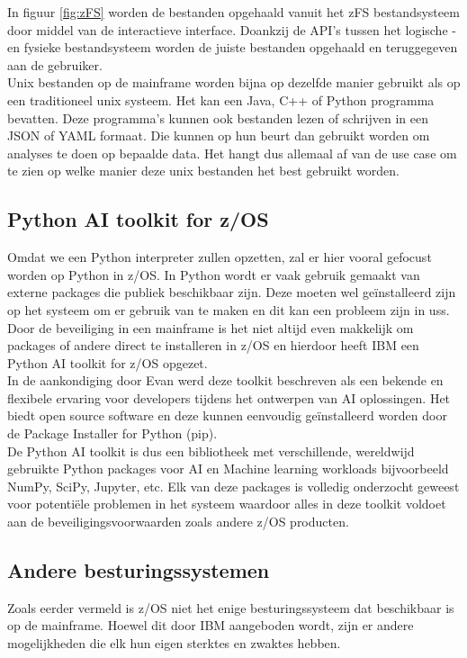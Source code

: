 In figuur \ref{fig:zFS} worden de bestanden opgehaald vanuit het zFS bestandsysteem door middel van de interactieve interface. Doankzij de API's tussen het logische -en fysieke bestandsysteem worden de juiste bestanden opgehaald en teruggegeven aan de gebruiker. \\

Unix bestanden op de mainframe worden bijna op dezelfde manier gebruikt als op een traditioneel unix systeem. Het kan een Java, C++ of Python programma bevatten. Deze programma's kunnen ook bestanden lezen of schrijven in een JSON of YAML formaat. Die kunnen op hun beurt dan gebruikt worden om analyses te doen op bepaalde data. Het hangt dus allemaal af van de use case om te zien op welke manier deze unix bestanden het best gebruikt worden. \autocite{Precisely2020}

\subsection{Python AI toolkit for z/OS}
Omdat we een Python interpreter zullen opzetten, zal er hier vooral gefocust worden op Python in z/OS. In Python wordt er vaak gebruik gemaakt van externe packages die publiek beschikbaar zijn. Deze moeten wel geïnstalleerd zijn op het systeem om er gebruik van te maken en dit kan een probleem zijn in \acrshort{uss}. Door de beveiliging in een mainframe is het niet altijd even makkelijk om packages of andere direct te installeren in z/OS \autocite{IBM2021} en hierdoor heeft IBM een Python AI toolkit for z/OS opgezet. \\

In de aankondiging door Evan \textcite{Rivera2023} werd deze toolkit beschreven als een bekende en flexibele ervaring voor developers tijdens het ontwerpen van AI oplossingen. Het biedt open source software en deze kunnen eenvoudig geïnstalleerd worden door de Package Installer for Python (pip). \\

De Python AI toolkit is dus een bibliotheek met verschillende, wereldwijd gebruikte Python packages voor AI en Machine learning workloads bijvoorbeeld NumPy, SciPy, Jupyter, etc. Elk van deze packages is volledig onderzocht geweest voor potentiële problemen in het systeem waardoor alles in deze toolkit voldoet aan de beveiligingsvoorwaarden zoals andere z/OS producten. \autocite{Bostian2023}

\subsection{Andere besturingssystemen}
Zoals eerder vermeld is z/OS niet het enige besturingssysteem dat beschikbaar is op de mainframe. Hoewel dit door IBM aangeboden wordt, zijn er andere mogelijkheden die elk hun eigen sterktes en zwaktes hebben. \\

